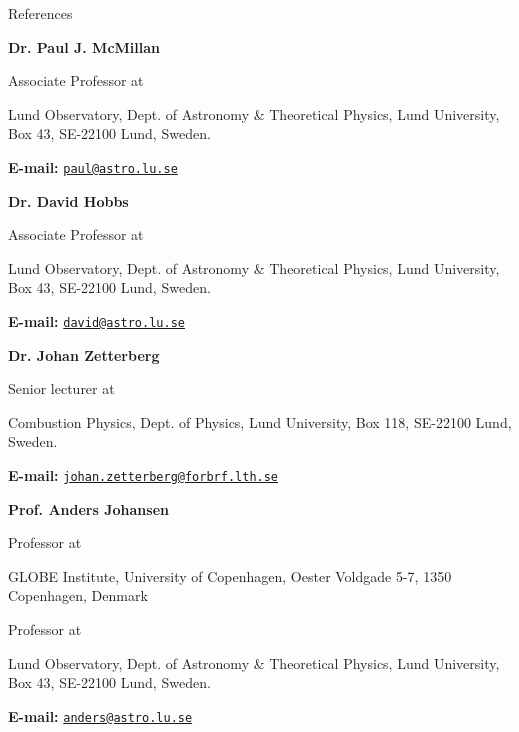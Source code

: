 
\prefix{}
\begin{rubric}{References}


	\entry*[1. ]%
	\textbf{Dr. Paul J. McMillan}\par
	Associate Professor at\par
	Lund Observatory, Dept. of Astronomy \& Theoretical Physics, Lund University, Box 43, SE-22100 Lund, Sweden. \par \textbf{E-mail:} \texttt{\href{mailto:paul@astro.lu.se}{paul@astro.lu.se}}
	\vspace{1pt}
	

	\entry*[2. ]%
	\textbf{Dr. David Hobbs}\par
	Associate Professor at\par
	Lund Observatory, Dept. of Astronomy \& Theoretical Physics, Lund University, Box 43, SE-22100 Lund, Sweden. \par \textbf{E-mail:} \texttt{\href{mailto:david@astro.lu.se}{david@astro.lu.se}}
	\vspace{1pt}
	

	\entry*[3. ]%
	\textbf{Dr. Johan Zetterberg}\par
	Senior lecturer at\par
	Combustion Physics, Dept. of Physics, Lund University, Box 118, SE-22100 Lund, Sweden. \par \textbf{E-mail:} \texttt{\href{mailto:johan.zetterberg@forbrf.lth.se}{johan.zetterberg@forbrf.lth.se}}
	\vspace{1pt}
	

	\entry*[4. ]%
	\textbf{Prof. Anders Johansen}\par
	Professor at\par
	GLOBE Institute, University of Copenhagen, Oester Voldgade 5-7, 1350 Copenhagen, Denmark \par
	Professor at\par
	Lund Observatory, Dept. of Astronomy \& Theoretical Physics, Lund University, Box 43, SE-22100 Lund, Sweden. \par \textbf{E-mail:} \texttt{\href{mailto:anders@astro.lu.se}{anders@astro.lu.se}}
	\vspace{1pt}
\end{rubric}